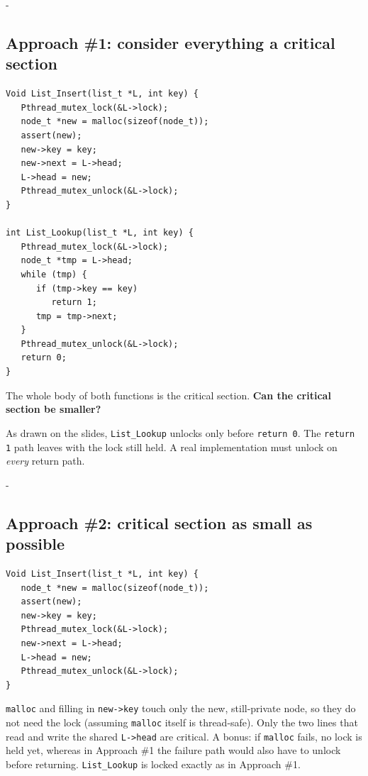 \documentclass[11pt,a4paper]{article}
\makeatletter
\newcommand{\keepspace}[1]{\par\penalty-100\begingroup
  \setlength{\dimen@}{#1}\dimen@ii\pagegoal\advance\dimen@ii-\pagetotal
  \ifdim\dimen@>\dimen@ii\ifdim\dimen@ii>\z@\vfil\fi\break\fi\endgroup}
\makeatother
\begin{document}
\keepspace{24\baselineskip}
\subsection{Approach \#1: consider everything a critical section}

\begin{lstlisting}
Void List_Insert(list_t *L, int key) {
   Pthread_mutex_lock(&L->lock);
   node_t *new = malloc(sizeof(node_t));
   assert(new);
   new->key = key;
   new->next = L->head;
   L->head = new;
   Pthread_mutex_unlock(&L->lock);
}

int List_Lookup(list_t *L, int key) {
   Pthread_mutex_lock(&L->lock);
   node_t *tmp = L->head;
   while (tmp) {
      if (tmp->key == key)
         return 1;
      tmp = tmp->next;
   }
   Pthread_mutex_unlock(&L->lock);
   return 0;
}
\end{lstlisting}

The whole body of both functions is the critical section. \textbf{Can the
critical section be smaller?}

\begin{warnbox}
As drawn on the slides, \texttt{List\_Lookup} unlocks only before
\texttt{return 0}. The \texttt{return 1} path leaves with the lock still
held. A real implementation must unlock on \emph{every} return path.
\end{warnbox}

\keepspace{14\baselineskip}
\subsection{Approach \#2: critical section as small as possible}

\begin{lstlisting}
Void List_Insert(list_t *L, int key) {
   node_t *new = malloc(sizeof(node_t));
   assert(new);
   new->key = key;
   Pthread_mutex_lock(&L->lock);
   new->next = L->head;
   L->head = new;
   Pthread_mutex_unlock(&L->lock);
}
\end{lstlisting}

\texttt{malloc} and filling in \texttt{new->key} touch only the new,
still-private node, so they do not need the lock (assuming \texttt{malloc}
itself is thread-safe). Only the two lines that read and write the shared
\texttt{L->head} are critical. A bonus: if \texttt{malloc} fails, no lock
is held yet, whereas in Approach \#1 the failure path would also have to
unlock before returning.
\texttt{List\_Lookup} is locked exactly as in Approach \#1.
\end{document}
